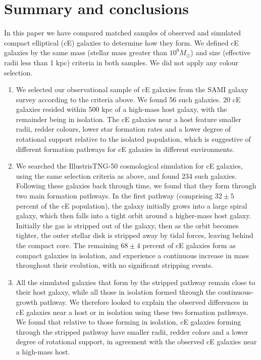 \documentclass[a4paper,fleqn,usenatbib]{mnras}
\begin{document}
\section{Summary and conclusions}

In this paper we have compared matched samples of observed and simulated  compact elliptical (cE) galaxies to  determine how they form. We defined cE galaxies by the same mass (stellar mass greater than $10^{9} M_{\odot}$) and size (effective radii less than 1 kpc) criteria in both samples. We did not apply any colour selection.

\begin{enumerate}
\item We selected our observational sample of cE galaxies from the SAMI galaxy survey according to the criteria above. We found 56 such galaxies. 20 cE galaxies resided within 500 kpc of a high-mass host galaxy, with the remainder being in isolation. The cE galaxies near a host feature smaller radii, redder colours, lower star formation rates and a lower degree of rotational support relative to the isolated population, which is suggestive of different formation pathways for cE galaxies in different environments. 

\item We searched the IllustrisTNG-50 cosmological simulation for cE galaxies, using the same selection criteria as above, and found 234 such galaxies. Following these galaxies back through time, we found that they form through two main formation pathways. In the first pathway (comprising $32\pm5$ percent of the cE population), the galaxy initially grows into a large spiral galaxy, which then falls into a tight orbit around a higher-mass host galaxy. Initially the gas is stripped out of the galaxy, then as the orbit becomes tighter, the outer stellar disk is stripped away by tidal forces, leaving behind the compact core. The remaining $68\pm4$ percent of cE galaxies form as compact galaxies in isolation, and experience a continuous increase in mass throughout their evolution, with no significant stripping events.

\item All the simulated galaxies that form by the stripped pathway remain close to their host galaxy, while all those in isolation formed through the continuous-growth pathway. We therefore looked to explain the observed differences in cE galaxies near a host or in isolation using these two formation pathways. We found that relative to those forming in isolation, cE galaxies forming through the stripped pathway have smaller radii, redder colors and a lower degree of rotational support, in agreement with the observed cE galaxies near a high-mass host. 

\end{enumerate}
\end{document}
